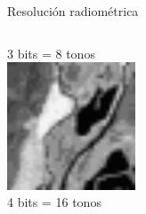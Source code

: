 \documentclass{beamer}
\begin{document}
\begin{frame}{Resolución radiométrica}
\begin{columns}
		3 bits = 8 tonos
		\includegraphics[width=1\textwidth]{IMGs/res_rad4}\\
		4 bits = 16 tonos
	\end{columns}	
\end{frame}
\end{document}
